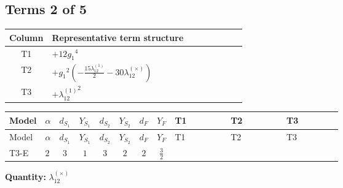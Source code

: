 \documentclass[8pt]{article}
\begin{document}
\begin{landscape}
\subsection*{Terms 2 of 5}
\begin{center}
\begin{tabular}{@{}c >{\raggedright\arraybackslash}p{0.82\linewidth}@{}}
\toprule
Column & Representative term structure \\
\midrule
T1 & \(\displaystyle +12 {g_1}^4\) \\
\midrule
T2 & \(\displaystyle +{g_1}^2 \left(-\frac{15 {\lambda_{12}^{(1)}}}{2}-30 {\lambda_{12}^{(\times)}}\right)\) \\
\midrule
T3 & \(\displaystyle +{\lambda_{12}^{(1)}}^2\) \\
\midrule
\bottomrule
\end{tabular}
\end{center}
\smallskip
\tiny
\begin{longtable}{@{}llcccccc >{\raggedright\arraybackslash}p{0.21\linewidth} >{\raggedright\arraybackslash}p{0.21\linewidth} >{\raggedright\arraybackslash}p{0.21\linewidth}@{}}
\toprule
Model & $\alpha$ & $d_{S_1}$ & $Y_{S_1}$ & $d_{S_2}$ & $Y_{S_2}$ & $d_F$ & $Y_F$ & T1 & T2 & T3 \\
\midrule
\endfirsthead
\toprule
Model & $\alpha$ & $d_{S_1}$ & $Y_{S_1}$ & $d_{S_2}$ & $Y_{S_2}$ & $d_F$ & $Y_F$ & T1 & T2 & T3 \\
\midrule
\endhead
T3-E & $2$ & $3$ & $1$ & $3$ & $2$ & $2$ & $\frac{3}{2}$ & \scriptsize\adjustbox{max width=\linewidth}{$\begin{gathered} +12 {g_1}^4\end{gathered}$} & \scriptsize\adjustbox{max width=\linewidth}{$\begin{gathered} +{g_1}^2 \left(-\frac{15 {\lambda_{12}^{(1)}}}{2}-30 {\lambda_{12}^{(\times)}}\right)\end{gathered}$} & \scriptsize\adjustbox{max width=\linewidth}{$\begin{gathered} +{\lambda_{12}^{(1)}}^2\end{gathered}$} \\
\midrule
\bottomrule
\end{longtable}
\clearpage
\noindent\textbf{Quantity: }$\lambda_{12}^{(\times)}$\par\smallskip

\end{landscape}
\end{document}
